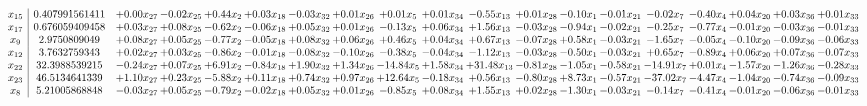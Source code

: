 \documentclass[9pt]{article}
\begin{document}
 \[\begin{array}{c| c c@{\hskip 2pt} c@{\hskip 2pt} c@{\hskip 2pt} c@{\hskip 2pt} c@{\hskip 2pt} c@{\hskip 2pt} c@{\hskip 2pt} c@{\hskip 2pt} c@{\hskip 2pt} c@{\hskip 2pt} c@{\hskip 2pt} c@{\hskip 2pt} c@{\hskip 2pt} c@{\hskip 2pt} c@{\hskip 2pt} c@{\hskip 2pt} c@{\hskip 2pt} }
 x_{15}   &  0.407991561411 & +  0.00 x_{27} & -0.02 x_{25} & +  0.44 x_{2} & +  0.03 x_{18} & -0.03 x_{32} & +  0.01 x_{26} & +  0.01 x_{5} & +  0.01 x_{34} & -0.55 x_{13} & +  0.01 x_{28} & -0.10 x_{1} & -0.01 x_{21} & -0.02 x_{7} & -0.40 x_{4} & +  0.04 x_{20} & +  0.03 x_{36} & +  0.01 x_{33}\\
 x_{17}   &  0.676059409458 & +  0.03 x_{27} & +  0.08 x_{25} & -0.62 x_{2} & -0.06 x_{18} & +  0.05 x_{32} & +  0.01 x_{26} & -0.13 x_{5} & +  0.06 x_{34} & +  1.56 x_{13} & -0.03 x_{28} & -0.94 x_{1} & -0.02 x_{21} & -0.25 x_{7} & -0.77 x_{4} & -0.01 x_{20} & -0.03 x_{36} & -0.01 x_{33}\\
 x_{9}   &  2.9750809049 & +  0.08 x_{27} & +  0.05 x_{25} & -0.77 x_{2} & -0.05 x_{18} & +  0.08 x_{32} & +  0.06 x_{26} & +  0.46 x_{5} & +  0.04 x_{34} & +  0.67 x_{13} & -0.07 x_{28} & +  0.58 x_{1} & -0.03 x_{21} & -1.65 x_{7} & -0.05 x_{4} & -0.10 x_{20} & -0.09 x_{36} & -0.06 x_{33}\\
 x_{12}   &  3.7632759343 & +  0.02 x_{27} & +  0.03 x_{25} & -0.86 x_{2} & -0.01 x_{18} & -0.08 x_{32} & -0.10 x_{26} & -0.38 x_{5} & -0.04 x_{34} & -1.12 x_{13} & -0.03 x_{28} & -0.50 x_{1} & -0.03 x_{21} & +  0.65 x_{7} & -0.89 x_{4} & +  0.06 x_{20} & +  0.07 x_{36} & -0.07 x_{33}\\
 x_{22}   &  32.3988539215 & -0.24 x_{27} & +  0.07 x_{25} & +  6.91 x_{2} & -0.84 x_{18} & +  1.90 x_{32} & +  1.34 x_{26} & -14.84 x_{5} & +  1.58 x_{34} & + 31.48 x_{13} & -0.81 x_{28} & -1.05 x_{1} & -0.58 x_{21} & -14.91 x_{7} & +  0.01 x_{4} & -1.57 x_{20} & -1.26 x_{36} & -0.28 x_{33}\\
 x_{23}   &  46.5134641339 & +  1.10 x_{27} & +  0.23 x_{25} & -5.88 x_{2} & +  0.11 x_{18} & +  0.74 x_{32} & +  0.97 x_{26} & + 12.64 x_{5} & -0.18 x_{34} & +  0.56 x_{13} & -0.80 x_{28} & +  8.73 x_{1} & -0.57 x_{21} & -37.02 x_{7} & -4.47 x_{4} & -1.04 x_{20} & -0.74 x_{36} & -0.09 x_{33}\\
 x_{8}   &  5.21005868848 & -0.03 x_{27} & +  0.05 x_{25} & -0.79 x_{2} & -0.02 x_{18} & +  0.05 x_{32} & +  0.01 x_{26} & -0.85 x_{5} & +  0.08 x_{34} & +  1.55 x_{13} & +  0.02 x_{28} & -1.30 x_{1} & -0.03 x_{21} & -0.14 x_{7} & -0.41 x_{4} & -0.01 x_{20} & -0.06 x_{36} & -0.01 x_{33}\\

\end{array}\]
\end{document}
